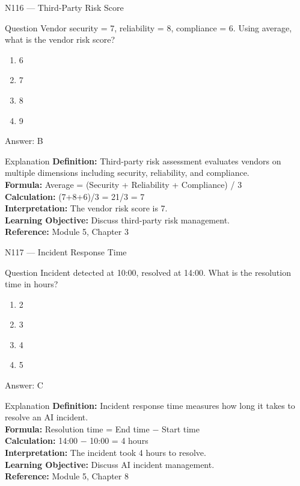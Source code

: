 \documentclass[aspectratio=169,8pt]{beamer}
\begin{document}
	\begin{frame}{N116 --- Third-Party Risk Score}
		\begin{block}{Question}
			Vendor security = 7, reliability = 8, compliance = 6. Using average, what is the vendor risk score?
			\begin{enumerate}
				\item 6
				\item 7
				\item 8
				\item 9
			\end{enumerate}
		\end{block}
		\begin{exampleblock}{Answer: B}\end{exampleblock}
		\begin{block}{Explanation}
			\textbf{Definition:} Third-party risk assessment evaluates vendors on multiple dimensions including security, reliability, and compliance.\\
			\textbf{Formula:} Average = (Security + Reliability + Compliance) / 3\\
			\textbf{Calculation:} (7+8+6)/3 = 21/3 = 7\\
			\textbf{Interpretation:} The vendor risk score is 7.\\
			\textbf{Learning Objective:} Discuss third-party risk management.\\
			\textbf{Reference:} Module 5, Chapter 3
		\end{block}
	\end{frame}
	
	\begin{frame}{N117 --- Incident Response Time}
		\begin{block}{Question}
			Incident detected at 10:00, resolved at 14:00. What is the resolution time in hours?
			\begin{enumerate}
				\item 2
				\item 3
				\item 4
				\item 5
			\end{enumerate}
		\end{block}
		\begin{exampleblock}{Answer: C}\end{exampleblock}
		\begin{block}{Explanation}
			\textbf{Definition:} Incident response time measures how long it takes to resolve an AI incident.\\
			\textbf{Formula:} Resolution time = End time $-$ Start time\\
			\textbf{Calculation:} 14:00 $-$ 10:00 = 4 hours\\
			\textbf{Interpretation:} The incident took 4 hours to resolve.\\
			\textbf{Learning Objective:} Discuss AI incident management.\\
			\textbf{Reference:} Module 5, Chapter 8
		\end{block}
	\end{frame}
	
\end{document}
